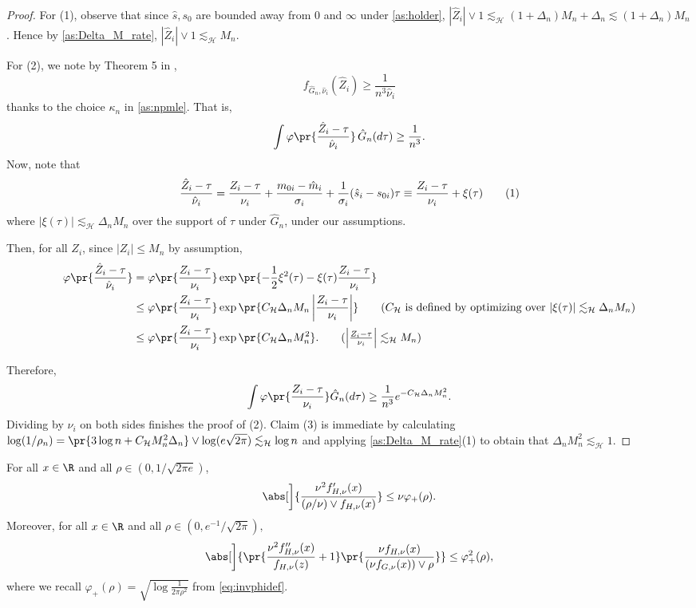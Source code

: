\documentclass[12pt, reqno]{amsart}
\newcommand\numberthis{\addtocounter{equation}{1}\tag{\theequation}}
\newcommand{\absauto}[1]{\left| #1 \right|}
\newcommand{\invphi}{\varphi_{+}}
\newcommand{\Hyperparams}{\mathcal{H}}
\newcommand{\leH}{\lesssim_{\mathcal{H}}}
\newcommand{\hatm}{\hat m}
\newcommand{\hats}{\hat s}
\numberwithin{equation}{section}
\begin{document}
\begin{refsection}
\begin{appendices}
\lemmalb*
\begin{proof}
For (1), observe that since $\hats,s_0$ are bounded away from 0 and $\infty$ under 
\cref{as:holder}, $|\hat Z_i|\vee 1 \leH (1 + \Delta_n) M_n +
\Delta_n \lesssim
(1+\Delta_n) M_n$. Hence by \cref{as:Delta_M_rate}, $|\hat
Z_i| \vee 1
\leH M_n$.

For (2), we note by Theorem 5 in \citet{jiang2020general}, \[
f_{\hat G_n, \hat\nu_i}(\hat Z_i) \ge \frac{1}{n^3 \hat\nu_i}
\] thanks to the choice $\kappa_n$ in \cref{as:npmle}. That is, \[
\int \varphi\pr{\frac{\hat Z_i - \tau}{\hat\nu_i}} \,\hat G_n(d\tau) \ge \frac{1}{n^3}.
\]
Now, note that \[
\frac{\hat Z_i - \tau}{\hat\nu_i} = 
\frac{Z_i - \tau}{\nu_i} + \frac{m_{0i} -
\hatm_{i}}{\sigma_i} + \frac{1}{\sigma_i}(\hats_i - s_{0i})\tau \equiv \frac{Z_i - \tau}
{\nu_i} +
\xi(\tau) \numberthis \label{eq:decompose_fake_z}
\]
where $|\xi(\tau)| \leH \Delta_n M_n$ over the support of $\tau$ under $\hat G_n$,  under
our assumptions.

Then, for all $Z_i$, since $|Z_i| \le M_n$ by assumption, \begin{align*}
\varphi\pr{
    \frac{\hat Z_i - \tau}{\hat\nu_i}
} &= \varphi\pr{ \frac{ Z_i - \tau}{\nu_i}} \exp\pr{
    -\frac{1}{2}\xi^2(\tau) - \xi(\tau)\frac{Z_i - \tau}{\nu_i}
}
\\
&\le \varphi\pr{ \frac{ Z_i - \tau}{\nu_i}}  \exp\pr{
    C_\Hyperparams \Delta_n M_n \absauto{\frac{ Z_i - \tau}{\nu_i}}
} \tag{$C_\Hyperparams$ is defined by optimizing over $|\xi(\tau)| \leH \Delta_n M_n$}
\\
&\le \varphi\pr{ \frac{Z_i - \tau}{\nu_i}} \exp\pr{
    C_{\Hyperparams} \Delta_n M_n^2
}. \tag{$\absauto{\frac{ Z_i - \tau}{\nu_i}} \leH M_n$}
\end{align*}

Therefore, \[
\int \varphi\pr{\frac{Z_i - \tau}{\nu_i}} \hat G_n(d\tau) \ge \frac{1}{n^3} e^
{-C_\Hyperparams \Delta_n M_n^2}.
\]
Dividing by $\nu_i$ on both sides finishes the proof of (2).
Claim (3) is immediate by calculating $\log(1/\rho_n) = \pr{3\log n + C_\Hyperparams M_n^2
\Delta_n} \vee \log(e\sqrt{2\pi}) \leH \log n$ and applying \cref{as:Delta_M_rate}(1) to
obtain that $\Delta_n
M_n^2 \leH 1$.
\end{proof}



\begin{lemma}
\label{thm:jianglemma2}
For all $x \in \R$ and all $\rho \in (0, 1/\sqrt{2\pi e})$,
\[
\abs[\bigg]{\frac{\nu^2f'_{H,\nu}(x)}{(\rho / \nu) \vee f_{H, \nu}(x)}} \le \nu
\invphi(\rho).
\]
Moreover, for all $x \in \R $ and all $\rho \in
(0, e^{-1} /
\sqrt{2\pi}),$
\[
\abs[\bigg]{\pr{\frac{
\nu^2 f''_{H, \nu}(x)}{f_{H, \nu}(z)} + 1} \pr{\frac{\nu f_{H, \nu}(x)}{(\nu f_{
G, \nu}(x)) \vee \rho}}} \le \invphi^2(\rho),
\]
where we recall $\invphi(\rho) = \sqrt{\log \frac{1}{2\pi \rho^2}}$ from 
\eqref{eq:invphidef}.
\end{lemma}


\end{appendices}
\end{refsection}
\end{document}
